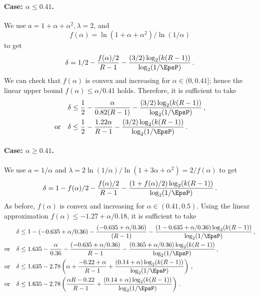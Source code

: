 	\paragraph{Case: $\alpha \leq 0.41$.} 
	We use $a = 1 + \alpha + \alpha^2, \lambda = 2$, and 
	$$ 
		f(\alpha) = \ln(1 + \alpha + \alpha^2)/\ln(1/\alpha)
	$$
	to get 
	$$
	\delta = 
		1/2 
			- \frac{f(\alpha)/2}{R - 1} 
			- \frac{(3/2) \log_2(k(R-1))}{\log_2(1/\EpsP)}
			\,.
	$$
	{\color{blue}We can check that }
	$f(\alpha)$ is convex and increasing for $\alpha \in (0, 0.41]$; 
	hence the linear upper bound 
	$f(\alpha) \leq \alpha/0.41$ holds. 
	Therefore, it is sufficient to take 
	\begin{align*}
		&\delta 
			\leq 
			\frac{1}{2} 
				- \frac{\alpha}{0.82 (R - 1)} 
				- \frac{(3/2) \log_2(k(R-1))}{\log_2(1/\EpsP)} 
				\,, \\
		\text{or}\quad&\delta \leq \frac{1}{2} 
				- \frac{1.22 \alpha}{R - 1} 
				- \frac{(3/2)\log_2(k(R-1))}{\log_2(1/\EpsP)} 
				\,.		
	\end{align*}

	\paragraph{Case: $\alpha \geq 0.41$.} 
	We use $a = 1/\alpha$ and 
	$\lambda = 2 \ln(1/\alpha)/\ln(1+3\alpha+\alpha^2) = 2/f(\alpha)$ to get 
	$$
	\delta = 
		1 - f(\alpha)/2
			- \frac{f(\alpha)/2}{R - 1} 
			- \frac{(1 + f(\alpha)/2 ) \log_2(k(R-1))}{\log_2(1/\EpsP) }
			\,.
	$$
	As before, $f(\alpha)$ is convex and increasing for $\alpha \in (0.41, 0.5)$. 
	Using the linear approximation 
	$f(\alpha) \leq -1.27 + \alpha/0.18$, it is sufficient to take 
	\begin{align*}
		&\delta \leq 
			1 - (-0.635 + \alpha/0.36)
				- \frac{(-0.635 + \alpha/0.36)}{(R - 1)} 
				- \frac{(1 - 0.635 + \alpha/0.36 ) \log_2(k(R-1))}{\log_2(1/\EpsP)} 
				\,,\\
		\text{or}\quad&
			\delta \leq 
				1.635 - \frac{\alpha}{0.36} 
				- \frac{(-0.635 + \alpha/0.36)}{R - 1} 
				- \frac{(0.365 + \alpha/0.36) \log_2(k(R-1))}{\log_2(1/\EpsP)} \,,\\
		\text{or}\quad&
			\delta \leq 
				1.635 - 2.78 \left( 
					\alpha
					+ \frac{-0.22 + \alpha}{R - 1} 
					+ \frac{(0.14 + \alpha) \log_2(k(R-1))}{\log_2(1/\EpsP)} 
				\right)\,,\\
		\text{or}\quad&
			\delta \leq 
				1.635 - 2.78 \left( 
					\frac{\alpha R -0.22}{R - 1} 
					+ \frac{(0.14 + \alpha) \log_2(k(R-1))}{\log_2(1/\EpsP)} 
				\right)
		\,.
	\end{align*}
	


